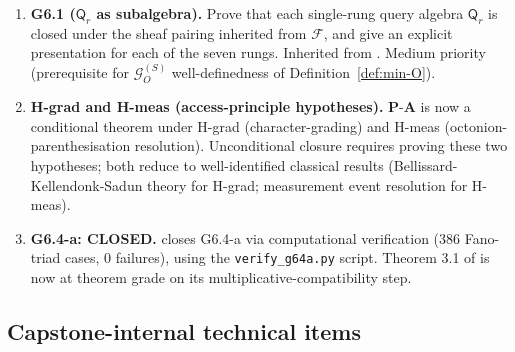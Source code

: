 \documentclass[11pt, a4paper]{amsart}
\theoremstyle{definition}
\newcommand{\Fcal}{\mathcal{F}}
\newcommand{\Gcal}{\mathcal{G}}
\newcommand{\Qalg}{\mathsf{Q}}
\begin{document}
\begin{enumerate}
\item \textbf{G6.1 ($\Qalg_r$ as subalgebra).} Prove that each
  single-rung query algebra $\Qalg_r$ is closed under the sheaf
  pairing inherited from $\Fcal$, and give an explicit
  presentation for each of the seven rungs. Inherited from
  \cite[\S 2.3]{CascadeObserverQueryAlgebra}. Medium priority
  (prerequisite for $\Gcal_O^{(S)}$ well-definedness of
  Definition~\ref{def:min-O}).
\item \textbf{H-grad and H-meas (access-principle hypotheses).}
  $\mathbf{P\text{-}A}$ is now a conditional theorem
  \cite{CascadeAccessPrinciple} under H-grad (character-grading)
  and H-meas (octonion-parenthesisation resolution). Unconditional
  closure requires proving these two hypotheses; both reduce to
  well-identified classical results (Bellissard-Kellendonk-Sadun
  theory for H-grad; \cite{CascadeQOBridge} measurement event
  resolution for H-meas).
\item \textbf{G6.4-a: CLOSED.}
  \cite{CascadeG64aClosure} closes G6.4-a via computational
  verification (386 Fano-triad cases, 0 failures), using the
  \texttt{verify\_g64a.py} script. Theorem 3.1 of
  \cite{CascadeQOBridge} is now at theorem grade on its
  multiplicative-compatibility step.
\end{enumerate}

\subsection{Capstone-internal technical items}
\end{document}

